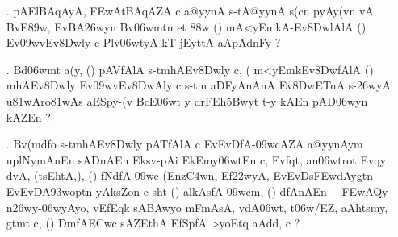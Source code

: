 \def\DevnagVersion{2.15}\documentclass{article}
\begin{document}
\begin{itemize}
\begin{itemize}
                \item[{\dn K}]{\dn  Ev\309wvEv\38DwAly\? pAWcmAnAnA\2 s\2-tAEtEr\3C4wAnA\2 EvqyAZA\2 \322w\?/ Ev{\rs '\re}soq\? s\2-tm\306wT\4, updFtA, \3FEw(y\2fA, t\?\2 t\?qA\2 EvqyAZA\2 pAVn{\rs -\re}\387w\39Cw\? rk\306wv\?n Env\?fAnFyA,{\rs ,\re} yTA{\rs ----\re}s\2-tkA\326wynAVkAl\2kAr{\rs -\re}fA-/AZA aAi`lsAEh(ypAWWn\387wm\? Env\?fn BArtFygEZtAv\?d\?{\rs -\re}d\?s\0nDm\0fA{\rs ???\re}EdnA iEthAs-y c t\? t\? Evqy\? yTAs\2\3C8w\2 Env\?fni(T\2 k\?cn cyE`t {\rs !\re} tAm etA\2 cnA a\306wtr\?Z Ek\2 Bv\306wtA, \5, {\rs ?\re}}
              \end{itemize}
              
 \item[{\dn \rn{24}}.]  {\dn pAElBAqAyA, \3FEwAtBAqAZA\2 c a@yynA\2 s\2-tA@yynA\2 s(c\4{\qvb}n pyA\0y(v\?n vA BvE\389w, EvBA\326wyn Bv\306wmt\?n et\? \388w\? {\rs (\re}{\dn {}}{\rs )\re} mA<yEmkA{\rs -\re}Ev\38DwlAlA {\rs (\re}{\dn {}}{\rs )\re} Ev\309wvEv\38Dwly\? c Plv\306wtyA kT\2 jEyttA\2 aApAdnFy\? {\rs ?\re}} 
 
 \item[{\dn \rn{25}}.] {\dn Bd\306wmt a(y{\rs ,\re} {\rs (\re}{\dn {}}{\rs )\re} pAVfAlA s\2-tmhAEv\38Dwly\? c{\rs ,\re} {\rs (\re}\dn {} m<yEmkEv\38DwfAlA {\rs (\re}{\dn {}}{\rs )\re} mhAEv\38Dwly\? Ev\309wvEv\38DwAly\? c s\2-tm aDFyAnAnA\2 Ev\38DwET\0nA\2 s\2-\326wyA u\381wAro\381wAs aESpy-(v\2 BcE\306wt y drFEh\35Bwyt\?{\rs ,\re} t-y kAEn pAD\306wy\?n kAZ\0En {\rs ?\re} }
 
 \item[{\dn \rn{26}}.]{\dn Bv(md\?fo s\2-tmhAEv\38Dwly\? pATfAlA c EvEvDfA-\309wcAZA a@yynAy\0m uplNymAnEn sADnAEn Ek\2sv-pA\2i EkEmy\306wtEn c{\rs ,\re} Evf\?qt, an\306wtrot\? Evqy\? d\?vA, {\rs (\re}tsEhtA,{\rs ),\re} {\rs (\re}{\dn {}}{\rs )\re} fNdfA-\309wc {\rs (\re}Enz\3C4w\?n{\rs ,\re} Ef\322wyA{\rs ,\re} EvEvDs\2\3FEwdAygt\?n EvEvDA\393wop\?t\?n yAksZon c sht {\rs (\re}{\dn {}}{\rs )\re} al\2kAsfA-\309wcm{\rs ,\re} {\rs (\re}{\dn {}}{\rs )\re} dfA\0nAEn{\rs ----\re}\3FEwAQy{\rs -\re}n\326wy{\rs -\re}\306wyAyo{\rs ,\re} v\4EfEqk sA\3BAwyo mFmA\2sA{\rs ,\re} v\?dA\306wt, t\306w/EZ{\rs ,\re} aAh\0tsmy, gtmt\2 c{\rs ,\re} {\rs (\re}{\dn {}}{\rs )\re} Dm\0fA\3ECwc\0 sAZ\?EthA EfSpfA >yoEtq aAd\?d, c {\rs ?\re}} 
 

\end{itemize}
\end{document}
